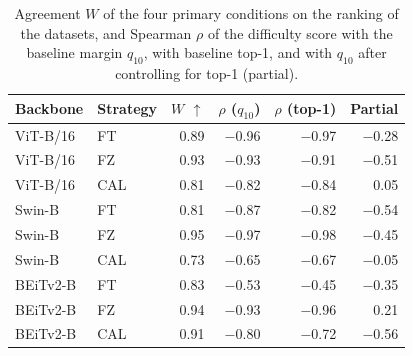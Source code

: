 \begin{table}[t]
\centering
\caption{Agreement $W$ of the four primary conditions on the ranking of the {} datasets, and Spearman $\rho$ of the difficulty score with the baseline margin $q_{10}$, with baseline top-1, and with $q_{10}$ after controlling for top-1 (partial).}
\label{tab:gatesShort}
\setlength{\tabcolsep}{3pt}
\small
\begin{tabular}{llrrrr}
\toprule
Backbone & Strategy & $W$ $\uparrow$ & $\rho$ ($q_{10}$) & $\rho$ (top-1) & Partial \\
\midrule
ViT-B/16 & FT & 0.89 & $-$0.96 & $-$0.97 & $-$0.28 \\
ViT-B/16 & FZ & 0.93 & $-$0.93 & $-$0.91 & $-$0.51 \\
ViT-B/16 & CAL & 0.81 & $-$0.82 & $-$0.84 & 0.05 \\
Swin-B & FT & 0.81 & $-$0.87 & $-$0.82 & $-$0.54 \\
Swin-B & FZ & 0.95 & $-$0.97 & $-$0.98 & $-$0.45 \\
Swin-B & CAL & 0.73 & $-$0.65 & $-$0.67 & $-$0.05 \\
BEiTv2-B & FT & 0.83 & $-$0.53 & $-$0.45 & $-$0.35 \\
BEiTv2-B & FZ & 0.94 & $-$0.93 & $-$0.96 & 0.21 \\
BEiTv2-B & CAL & 0.91 & $-$0.80 & $-$0.72 & $-$0.56 \\
\bottomrule
\end{tabular}
\end{table}

